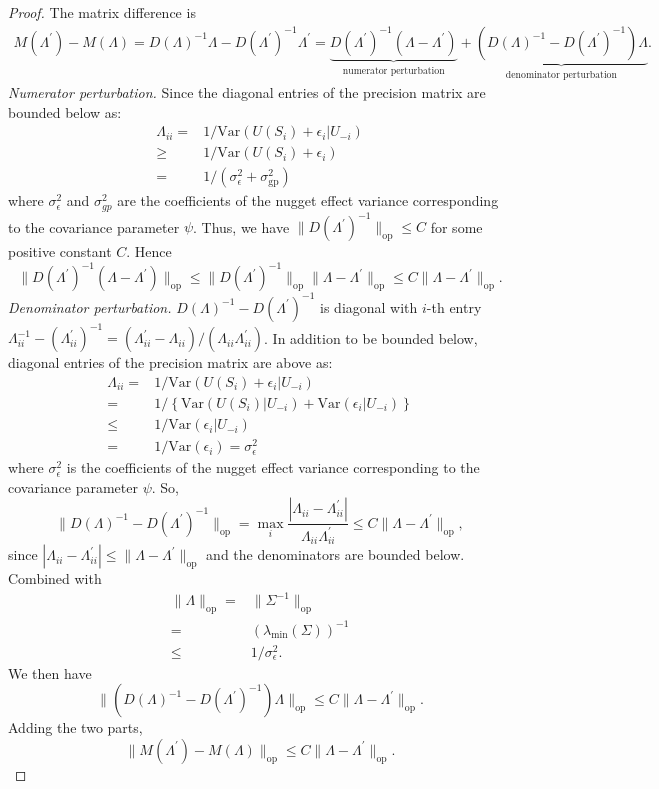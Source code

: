 \begin{proof}
The matrix difference is
\begin{align*}
M(\Lambda^\prime)-M(\Lambda) = D(\Lambda)^{-1}\Lambda - D(\Lambda^\prime)^{-1}\Lambda^\prime
= \underbrace{D(\Lambda^\prime)^{-1}(\Lambda-\Lambda^\prime)}_{\text{numerator perturbation}}
+ \underbrace{(D(\Lambda)^{-1}-D(\Lambda^\prime)^{-1})\Lambda}_{\text{denominator perturbation}}.
\end{align*}
\emph{Numerator perturbation.}
Since the diagonal entries of the precision matrix are bounded below as:
\begin{align*}
    \Lambda_{ii} =& 1/\text{Var}(U(S_i)+\epsilon_i|U_{-i})\\
    \geq & 1/\text{Var}(U(S_i)+\epsilon_i)\\
    = & 1/(\sigma_\epsilon^{2} +\sigma_{\text{gp}}^{2})
\end{align*}
where $\sigma_\epsilon^{2}$ and $\sigma_{gp}^{2}$ are the coefficients of the nugget effect variance corresponding to the covariance parameter $\psi$. Thus, we have
$\|D(\Lambda^\prime)^{-1}\|_{\mathrm{op}}\leq C$ for some positive constant $C$.  Hence
$$\|D(\Lambda^\prime)^{-1}(\Lambda-\Lambda^\prime)\|_{\mathrm{op}}\leq \|D(\Lambda^\prime)^{-1}\|_{\mathrm{op}}\|\Lambda-\Lambda^\prime\|_{\mathrm{op}}\leq C\|\Lambda-\Lambda^\prime\|_{\mathrm{op}}.$$
\emph{Denominator perturbation.}
$D(\Lambda)^{-1}-D(\Lambda^\prime)^{-1}$ is diagonal with $i$-th entry $\Lambda_{ii}^{-1}-(\Lambda_{ii}^\prime)^{-1}=(\Lambda_{ii}^\prime-\Lambda_{ii})/(\Lambda_{ii}\Lambda_{ii}^\prime)$. In addition to be bounded below, diagonal entries of the precision matrix are above as:
\begin{align*}
    \Lambda_{ii} =& 1/\text{Var}(U(S_i)+\epsilon_i|U_{-i})\\
    = & 1/\left\{\text{Var}(U(S_i)|U_{-i})+\text{Var}(\epsilon_i|U_{-i})\right\}\\
    \leq & 1/\text{Var}(\epsilon_i|U_{-i})\\
    = & 1/\text{Var}(\epsilon_i) = \sigma_\epsilon^2
\end{align*}
where $\sigma_\epsilon^{2}$ is the coefficients of the nugget effect variance corresponding to the covariance parameter $\psi$. So,
$$\|D(\Lambda)^{-1}-D(\Lambda^\prime)^{-1}\|_{\mathrm{op}} = \max_i\frac{|\Lambda_{ii}-\Lambda_{ii}^\prime|}{\Lambda_{ii}\Lambda_{ii}^\prime}\leq C\|\Lambda-\Lambda^\prime\|_{\mathrm{op}},$$
since $|\Lambda_{ii}-\Lambda_{ii}^\prime|\leq\|\Lambda-\Lambda^\prime\|_{\mathrm{op}}$ and the denominators are bounded below. Combined with 
\begin{align*}
\|\Lambda\|_{\mathrm{op}}=&\|\Sigma^{-1}\|_{\mathrm{op}}\\
    =& (\lambda_{\min}(\Sigma))^{-1}\\
    \leq & 1/\sigma^2_\epsilon.
\end{align*}
We then have
$$\|(D(\Lambda)^{-1}-D(\Lambda^\prime)^{-1})\Lambda\|_{\mathrm{op}}\leq C\|\Lambda-\Lambda^\prime\|_{\mathrm{op}}.$$
Adding the two parts,
$$\|M(\Lambda^\prime)-M(\Lambda)\|_{\mathrm{op}}\leq C\|\Lambda-\Lambda^\prime\|_{\mathrm{op}}.$$


\end{proof}

